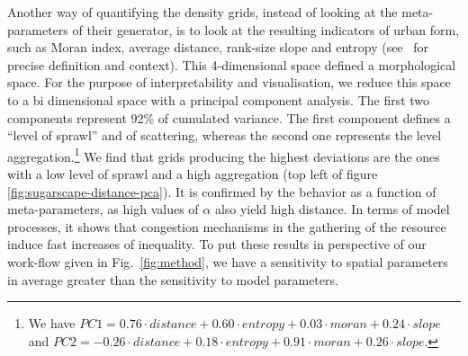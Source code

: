 \documentclass[Royal,sageh,times]{sagej}
\begin{document}
Another way of quantifying the density grids, instead of looking at the meta-parameters of their generator, is to look at the resulting indicators of urban form, such as Moran index, average distance, rank-size slope and entropy (see~\cite{LeNechet2015} for precise definition and context). This 4-dimensional space defined a morphological space. For the purpose of interpretability and visualisation, we reduce this space to a bi dimensional space with a principal component analysis. The first two components represent 92\% of cumulated variance. The first component defines a ``level of sprawl'' and of scattering, whereas the second one represents the level aggregation.\footnote{We have $PC1 = 0.76\cdot distance + 0.60\cdot entropy + 0.03\cdot moran + 0.24\cdot slope$ and $PC2 = -0.26\cdot distance + 0.18\cdot entropy + 0.91\cdot moran + 0.26\cdot slope$.} We find that grids producing the highest deviations are the ones with a low level of sprawl and a high aggregation (top left of figure \ref{fig:sugarscape-distance-pca}). It is confirmed by the behavior as a function of meta-parameters, as high values of $\alpha$ also yield high distance. In terms of model processes, it shows that congestion mechanisms in the gathering of the resource induce fast increases of inequality. To put these results in perspective of our work-flow given in Fig.~\ref{fig:method}, we have a sensitivity to spatial parameters in average greater than the sensitivity to model parameters.


\end{document}
